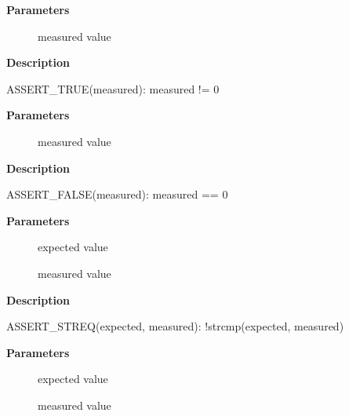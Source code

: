 \documentclass[a4paper,8pt,english]{sphinxmanual}
\begin{document}
\textbf{Parameters}
\begin{description}
\item[{}] \leavevmode
measured value

\end{description}

\textbf{Description}

ASSERT\_TRUE(measured): measured != 0

\begin{fulllineitems}
\label{dev-tools/kselftest:c.ASSERT_FALSE}
\end{fulllineitems}


\textbf{Parameters}
\begin{description}
\item[{}] \leavevmode
measured value

\end{description}

\textbf{Description}

ASSERT\_FALSE(measured): measured == 0

\begin{fulllineitems}
\label{dev-tools/kselftest:c.ASSERT_STREQ}
\end{fulllineitems}


\textbf{Parameters}
\begin{description}
\item[{}] \leavevmode
expected value

\item[{}] \leavevmode
measured value

\end{description}

\textbf{Description}

ASSERT\_STREQ(expected, measured): !strcmp(expected, measured)

\begin{fulllineitems}
\label{dev-tools/kselftest:c.ASSERT_STRNE}
\end{fulllineitems}


\textbf{Parameters}
\begin{description}
\item[{}] \leavevmode
expected value

\item[{}] \leavevmode
measured value

\end{description}
\end{document}
